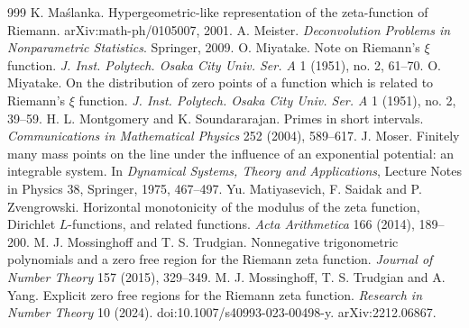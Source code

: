 \begin{thebibliography}{999}
 K. Ma\'slanka. Hypergeometric-like representation of the zeta-function of Riemann. arXiv:math-ph/0105007, 2001.
 A. Meister. \emph{Deconvolution Problems in Nonparametric Statistics}. Springer, 2009.
 O. Miyatake. Note on Riemann's $\xi$ function. \emph{J. Inst. Polytech. Osaka City Univ. Ser. A} 1 (1951), no. 2, 61--70.
 O. Miyatake. On the distribution of zero points of a function which is related to Riemann's $\xi$ function. \emph{J. Inst. Polytech. Osaka City Univ. Ser. A} 1 (1951), no. 2, 39--59.
 H. L. Montgomery and K. Soundararajan. Primes in short intervals. \emph{Communications in Mathematical Physics} 252 (2004), 589--617.
 J. Moser. Finitely many mass points on the line under the influence of an exponential potential: an integrable system. In \emph{Dynamical Systems, Theory and Applications}, Lecture Notes in Physics 38, Springer, 1975, 467--497.
 Yu. Matiyasevich, F. Saidak and P. Zvengrowski. Horizontal monotonicity of the modulus of the zeta function, Dirichlet $L$-functions, and related functions. \emph{Acta Arithmetica} 166 (2014), 189--200.
 M. J. Mossinghoff and T. S. Trudgian. Nonnegative trigonometric polynomials and a zero free region for the Riemann zeta function. \emph{Journal of Number Theory} 157 (2015), 329--349.
 M. J. Mossinghoff, T. S. Trudgian and A. Yang. Explicit zero free regions for the Riemann zeta function. \emph{Research in Number Theory} 10 (2024). doi:10.1007/s40993-023-00498-y. arXiv:2212.06867.

\end{thebibliography}
